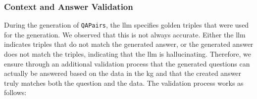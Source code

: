 


\subsubsection{Context and Answer Validation} 

During the generation of \texttt{QAPairs}, the \gls{llm} specifies golden triples that were used for the generation. We observed that this is not always accurate. Either the \gls{llm} indicates triples that do not match the generated answer, or the generated answer does not match the triples, indicating that the \gls{llm} is hallucinating. Therefore, we ensure through an additional validation process that the generated questions can actually be answered based on the data in the \gls{kg} and that the created answer truly matches both the question and the data. The validation process works as follows:


